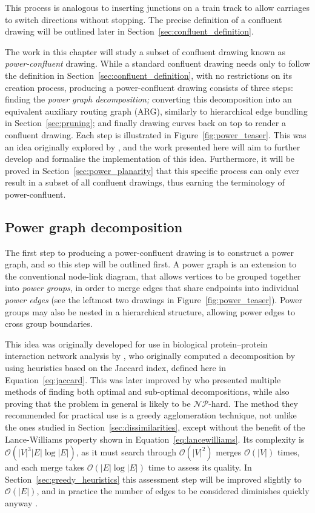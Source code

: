 This process is analogous to inserting junctions on a train track to allow carriages to switch directions without stopping.
The precise definition of a confluent drawing will be outlined later in Section~\ref{sec:confluent_definition}.

The work in this chapter will study a subset of confluent drawing known as \emph{power-confluent} drawing.
While a standard confluent drawing needs only to follow the definition in Section~\ref{sec:confluent_definition}, with no restrictions on its creation process, producing a power-confluent drawing consists of three steps: finding the \emph{power graph decomposition;} converting this decomposition into an equivalent auxiliary routing graph (ARG), similarly to hierarchical edge bundling in Section~\ref{sec:pruning}; and finally drawing curves back on top to render a confluent drawing. Each step is illustrated in Figure~\ref{fig:power_teaser}. This was an idea originally explored by \citet{Bach2017}, and the work presented here will aim to further develop and formalise the implementation of this idea. Furthermore, it will be proved in Section~\ref{sec:power_planarity} that this specific process can only ever result in a subset of all confluent drawings, thus earning the terminology of power-confluent.

\subsection{Power graph decomposition}
\label{sec:power_graph}
The first step to producing a power-confluent drawing is to construct a power graph, and so this step will be outlined first. A power graph is an extension to the conventional node-link diagram, that allows vertices to be grouped together into \emph{power groups}, in order to merge edges that share endpoints into individual \emph{power edges} (see the leftmost two drawings in Figure~\ref{fig:power_teaser}). Power groups may also be nested in a hierarchical structure, allowing power edges to cross group boundaries.

This idea was originally developed for use in biological protein--protein interaction network analysis by \citet{Royer2008}, who originally computed a decomposition by using heuristics based on the Jaccard index, defined here in Equation~\ref{eq:jaccard}. This was later improved by \citet{Dwyer2014} who presented multiple methods of finding both optimal and sub-optimal decompositions, while also proving that the problem in general is likely to be $\mathcal{NP}$-hard. The method they recommended for practical use is a greedy agglomeration technique, not unlike the ones studied in Section~\ref{sec:dissimilarities}, except without the benefit of the Lance-Williams property shown in Equation~\eqref{eq:lancewilliams}. Its complexity is $\mathcal{O}(|V|^3|E|\log|E|)$, as it must search through $\mathcal{O}(|V|^2)$ merges $\mathcal{O}(|V|)$ times, and each merge takes $\mathcal{O}(|E|\log|E|)$ time to assess its quality. In Section~\ref{sec:greedy_heuristics} this assessment step will be improved slightly to $\mathcal{O}(|E|)$, and in practice the number of edges to be considered diminishes quickly anyway \citep{Dwyer2014}.


